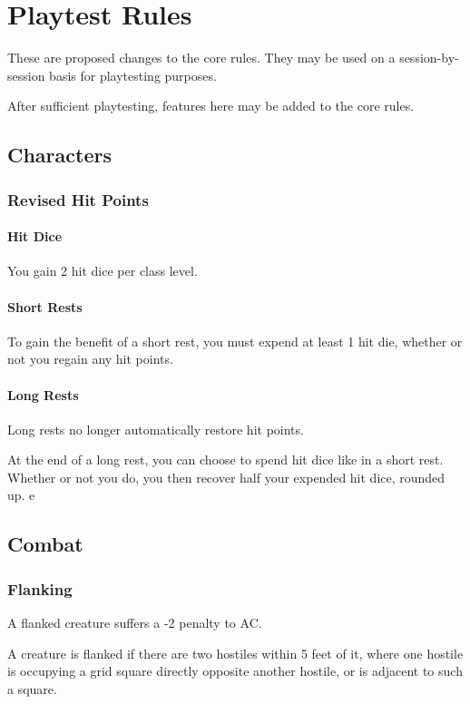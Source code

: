 \documentclass[House_Rules.tex]{subfiles}
\begin{document}
\chapter{Playtest Rules}
These are proposed changes to the core rules. They may be used on a session-by-session basis for playtesting purposes. 

After sufficient playtesting, features here may be added to the core rules.

\section{Characters}

\subsection{Revised Hit Points}

\subsubsection{Hit Dice}
You gain 2 hit dice per class level. 

\subsubsection{Short Rests}
To gain the benefit of a short rest, you must expend at least 1 hit die, whether or not you regain any hit points.

\subsubsection{Long Rests}
Long rests no longer automatically restore hit points.

At the end of a long rest, you can choose to spend hit dice like in a short rest. Whether or not you do, you then recover half your expended hit dice, rounded up.
e
\section{Combat}

\subsection{Flanking}
A flanked creature suffers a -2 penalty to AC.

A creature is flanked if there are two hostiles within 5 feet of it, where one hostile is occupying a grid square directly opposite another hostile, or is adjacent to such a square.
\end{document}
